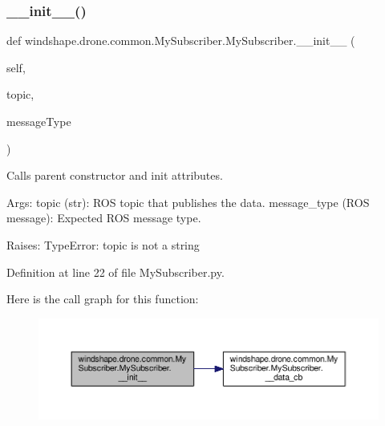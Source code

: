 \subsubsection{\texorpdfstring{\+\_\+\+\_\+init\+\_\+\+\_\+()}{\_\_init\_\_()}}
{\footnotesize\ttfamily def windshape.\+drone.\+common.\+My\+Subscriber.\+My\+Subscriber.\+\_\+\+\_\+init\+\_\+\+\_\+ (\begin{DoxyParamCaption}\item[{}]{self,  }\item[{}]{topic,  }\item[{}]{message\+Type }\end{DoxyParamCaption})}

\begin{DoxyVerb}Calls parent constructor and init attributes. 

Args:
    topic (str): ROS topic that publishes the data.
    message_type (ROS message): Expected ROS message type.
    
Raises:
    TypeError: topic is not a string
\end{DoxyVerb}
 

Definition at line 22 of file My\+Subscriber.\+py.

Here is the call graph for this function\+:\nopagebreak
\begin{figure}[H]
\begin{center}
\leavevmode
\includegraphics[width=350pt]{classwindshape_1_1drone_1_1common_1_1_my_subscriber_1_1_my_subscriber_aab8903d5a44710a25575d8462b195d64_cgraph}
\end{center}
\end{figure}
\mbox{\label{classwindshape_1_1drone_1_1common_1_1_my_subscriber_1_1_my_subscriber_ad60c57cf3ae7c6eabcfe0d7c6864539e}} 
